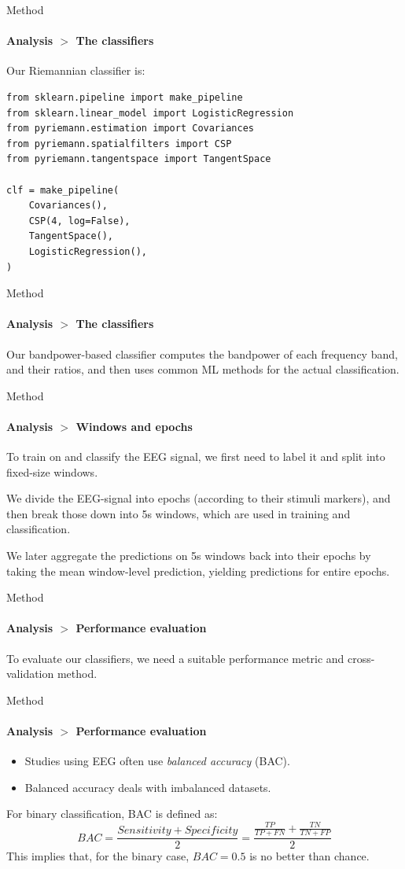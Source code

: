 \documentclass[xcolor={dvipsnames,table},12pt]{beamer}
\begin{document}
\begin{frame}[fragile]{Method}
    \framesubtitle{Analysis $>$ The classifiers}

    Our Riemannian classifier is:
    
\begin{verbatim}
from sklearn.pipeline import make_pipeline
from sklearn.linear_model import LogisticRegression
from pyriemann.estimation import Covariances
from pyriemann.spatialfilters import CSP
from pyriemann.tangentspace import TangentSpace

clf = make_pipeline(
    Covariances(),
    CSP(4, log=False),
    TangentSpace(),
    LogisticRegression(),
)
\end{verbatim}
\end{frame}

\begin{frame}{Method}
    \framesubtitle{Analysis $>$ The classifiers}

    Our bandpower-based classifier computes the bandpower of each frequency band, and their ratios, and then uses common ML methods for the actual classification.
\end{frame}


\begin{frame}{Method}
    \framesubtitle{Analysis $>$ Windows and epochs}
    To train on and classify the EEG signal, we first need to label it and split into fixed-size windows.

    We divide the EEG-signal into epochs (according to their stimuli markers), and then break those down into 5s windows, which are used in training and classification.

    We later aggregate the predictions on 5s windows back into their epochs by taking the mean window-level prediction, yielding predictions for entire epochs.
\end{frame}

\begin{frame}{Method}
    \framesubtitle{Analysis $>$ Performance evaluation}
    To evaluate our classifiers, we need a suitable performance metric and cross-validation method.
\end{frame}

\begin{frame}{Method}
    \framesubtitle{Analysis $>$ Performance evaluation}
    \begin{itemize}
        \item Studies using EEG often use \emph{balanced accuracy} (BAC).
        \item Balanced accuracy deals with imbalanced datasets.
    \end{itemize}

    \vspace{2em}

    For binary classification, BAC is defined as:
    \[ BAC = \frac{Sensitivity + Specificity}{2} = \frac{\frac{TP}{TP + FN} + \frac{TN}{TN + FP}}{2} \]
    This implies that, for the binary case, $BAC = 0.5$ is no better than chance.
\end{frame}
\end{document}
